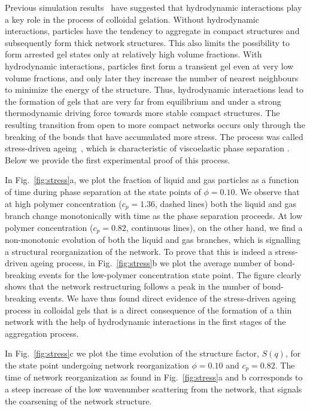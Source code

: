 \documentclass[a4paper,preprint,superscriptaddress]{revtex4}
\begin{document}
Previous simulation results~\cite{tanaka2000,tanaka2007spontaneous,furukawa2010key} have suggested that hydrodynamic interactions play
a key role in the process of colloidal gelation. Without hydrodynamic interactions, particles have the tendency to
aggregate in compact structures and subsequently form thick network structures. This also limits the possibility to
form arrested gel states only at relatively high volume fractions. With hydrodynamic interactions, particles first form
a transient gel even at very low volume fractions, and only later they increase the number of
nearest neighbours to minimize the energy of the structure. 
Thus, hydrodynamic interactions lead to the formation of gels that are very far from equilibrium and under a strong thermodynamic driving force 
towards more stable compact structures. 
The resulting transition from open to more compact networks occurs only through
the breaking of the bonds that have accumulated more stress. The process was called stress-driven ageing~\cite{tanaka2007spontaneous}, 
which is characteristic of viscoelastic phase separation \cite{tanaka2000viscoelastic}. 
Below we provide the first experimental proof of this process.

In Fig.~\ref{fig:stress}a, we plot the fraction of liquid and gas particles as a function of time during phase separation
at the state points of $\phi=0.10$. We observe that at high polymer concentration ($c_p=1.36$, dashed lines) both the
liquid and gas branch change monotonically with time as the phase separation proceeds. At low polymer concentration
($c_p=0.82$, continuous lines), on the other hand, we find a non-monotonic evolution of both the liquid and gas branches, which is signalling
a structural reorganization of the network. To prove that this is indeed a stress-driven ageing process, in Fig.~\ref{fig:stress}b 
we plot the average number of bond-breaking events for the low-polymer concentration state point. The figure clearly shows that
the network restructuring follows a peak in the number of bond-breaking events. We have thus found direct evidence of the
stress-driven ageing process in colloidal gels that is a direct consequence of the formation of a thin network with the help of hydrodynamic interactions in the first stages
of the aggregation process.

In Fig.~\ref{fig:stress}c we plot the time evolution of the structure factor, $S(q)$, for the state point
undergoing network reorganization $\phi=0.10$ and $c_p=0.82$. The time of network reorganization as found in Fig.~\ref{fig:stress}a and b
corresponds to a steep increase of the low wavenumber scattering from the network, that signals the coarsening of the network structure. 
\end{document}
